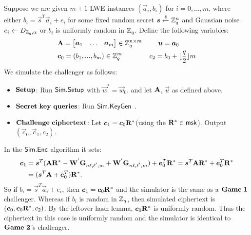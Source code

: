 Suppose we are given $m+1$ LWE instances $(\vec{a}_{i},b_{i})$ for $i=0,...,m$, where either $b_{i}=\vec{s}^{T}\vec{a}_{i}+e_{i}$ for some fixed random secret $\boldsymbol{s}\xleftarrow{\$} \mathbb{Z}^{n}_{q}$ and  Gaussian noise $e_{i}\leftarrow D_{\mathbb{Z}_{q},\alpha}$ or $b_{i}$ is uniformly random in $\mathbb{Z}_{q}$. Define the following variables:
\begin{equation}
\begin{split}
&\mathbf{A}=\begin{bmatrix}
\boldsymbol{a}_{1}&\ldots&\boldsymbol{a}_{m}
\end{bmatrix} \in \mathbb{Z}^{n \times m}_{q} ~~~~~~~ \boldsymbol{u}=\boldsymbol{a}_{0}\\
&\boldsymbol{c}_{0}=(b_{1},...,b_{m}) \in \mathbb{Z}^{m}_{q}~~~~~~~~~~~~c_{2}=b_{0}+\lfloor \frac{q}{2}\rfloor m\\
\end{split}
\end{equation}
We simulate the challenger as follows:
\begin{itemize}
\item $\mathbf{Setup}$: Run $\mathsf{Sim}.\mathsf{Setup}$ with $\vec{w}^{*}=\vec{w}_{0}$. and let $\mathbf{A}$, $\vec{u}$ as defined above.

\item $\mathbf{Secret}\  \mathbf{key}\  \mathbf{queries}$: Run $\mathsf{Sim}.\mathsf{KeyGen}$ .

\item $\mathbf{Challenge}\  \mathbf{ciphertext}$: Let $\boldsymbol{c}_{1}=\boldsymbol{c}_{0}\mathbf{R}^{*}$(using the $\mathbf{R}^{*} \in \mathsf{msk}$). Output $(\vec{c}_{0}, \vec{c}_{1}, c_{2})$.
\end{itemize}
In the $\mathsf{Sim}.\mathsf{Enc}$ algorithm it sets:
\begin{equation}
\begin{split}
\boldsymbol{c}_{1}&=\boldsymbol{s}^{T}(\mathbf{A}\mathbf{R}^{*}-\mathbf{W}^{'}\mathbf{G}_{n\ell,\ell^{'},m}+\mathbf{W}^{'}\mathbf{G}_{n\ell,\ell^{'},m})+\boldsymbol{e}^{T}_{0}\mathbf{R}^{*}=\boldsymbol{s}^{T}\mathbf{A}\mathbf{R}^{*}+\boldsymbol{e}^{T}_{0}\mathbf{R}^{*}\\
&=(\boldsymbol{s}^{T}\mathbf{A}+\boldsymbol{e}^{T}_{0})\mathbf{R}^{*}.
\end{split}
\end{equation}
So if $b_{i}=\vec{s}^{T}\vec{a}_{i}+e_{i}$, then $\boldsymbol{c}_{1}=\boldsymbol{c}_{0}\mathbf{R}^{*}$ and the simulator is the same as a $\mat{Game\ 1}$ challenger. Whereas if $b_{i}$ is random in $\mathbb{Z}_{q}$, then simulated ciphertext is $(\boldsymbol{c}_{0}, \boldsymbol{c}_{0}\mathbf{R}^{*}, c_{2})$. By the leftover hash lemma, $\boldsymbol{c}_{0}\mathbf{R}^{*}$ is uniformly random. Thus the ciphertext in this case is uniformly random and the simulator is identical to $\mat{Game\ 2}$'s challenger.\


